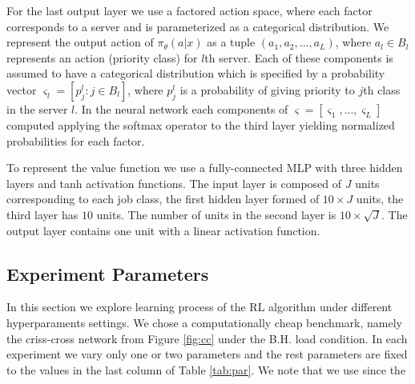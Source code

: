 \documentclass[11pt]{article}
\theoremstyle{definition}
\numberwithin{equation}{section}
\begin{document}
For the last output layer we use a factored action space, where each factor corresponds to a server and is parameterized as a categorical distribution.
We represent the output action of $\pi_\theta(a|x)$ as a tuple $(a_1, a_2, . . . , a_L)$, where $a_l\in B_l$ represents an action (priority class) for $l$th server.
Each of these components is assumed to have a categorical distribution which is specified by a probability vector $\varsigma_l = [p_j^l: j\in B_l]$, where $p_j^l$ is a probability of giving priority to $j$th class in the server $l$. In the neural network each components of $\varsigma = [\varsigma_1, ..., \varsigma_L]$ computed applying the softmax operator to the third layer yielding normalized probabilities for each factor.


To represent the value function we use a fully-connected MLP with three hidden layers and tanh activation functions. The input layer is composed of $J$ units corresponding to each job class, the first hidden layer formed of $10\times J$ units, the third layer has $10$ units. The number of units in the  second layer is $10\times \sqrt{J}$. The output layer contains one unit with a linear activation function.

\subsection{Experiment Parameters}\label{sec:par}
In this section we explore learning process of the RL algorithm under different hyperparaments settings. We chose a computationally cheap benchmark, namely the criss-cross network from Figure \ref{fig:cc} under the B.H. load condition. In each experiment we vary only one or two parameters and the rest parameters  are fixed to the values in the last column of Table \ref{tab:par}. We note that we use since the
\end{document}
